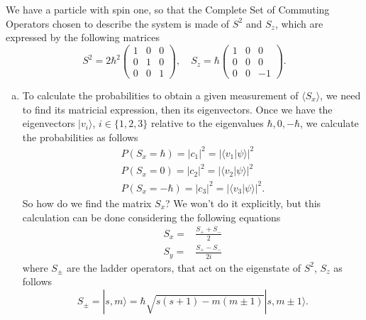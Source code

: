 We have a particle with spin one, so that the Complete Set of Commuting Operators chosen to describe the system is made of $S^2$ and $S_z$, which are expressed by the following matrices
\begin{equation}
    S^2 = 2 \hbar^2 
    \begin{pmatrix}
        1 & 0 & 0 \\
        0 & 1 & 0 \\
        0 & 0 & 1
    \end{pmatrix}, \quad
    S_z = \hbar
    \begin{pmatrix}
        1 & 0 & 0 \\
        0 & 0 & 0 \\
        0 & 0 & -1
    \end{pmatrix}.
\end{equation}
\begin{enumerate}[(a)]
    \item To calculate the probabilities to obtain a given measurement of $\langle S_x \rangle$, we need to find its matricial expression, then its eigenvectors. Once we have the eigenvectors $| v_i \rangle$, $i \in \{ 1, 2, 3 \}$ relative to the eigenvalues $ \hbar, 0, -\hbar$, we calculate the probabilities as follows
    \begin{gather}
        \label{eq: probabilities_Sx}
        P(S_x = \hbar) = | c_{1} |^2 = | \langle v_1 | \psi \rangle |^2 \\
        P(S_x = 0) = | c_{2} |^2 = | \langle v_2 | \psi \rangle |^2 \\
        P(S_x = -\hbar) = | c_{3} |^2 = | \langle v_3 | \psi \rangle |^2.
    \end{gather}  
    So how do we find the matrix $S_x$? We won't do it explicitly, but this calculation can be done considering the following equations
    \begin{subequations}
        \label{eq: Sxy_ladder}
        \begin{align}
            S_x = & \frac{S_+ + S_-}{2} \label{eq: Sx_ladder} \\
            S_y = & \frac{S_+ - S_-}{2i} \label{eq: Sy_ladder} 
    \end{align}
    \end{subequations}
    where $S_\pm$ are the ladder operators, that act on the eigenstate of $S^2$, $S_z$ as follows
    \begin{equation}
        \label{eq: S_ladder}
        S_\pm = | s, m \rangle = \hbar \sqrt{s(s+1) - m(m \pm 1)} | s, m \pm 1 \rangle.
    \end{equation}

\end{enumerate}
